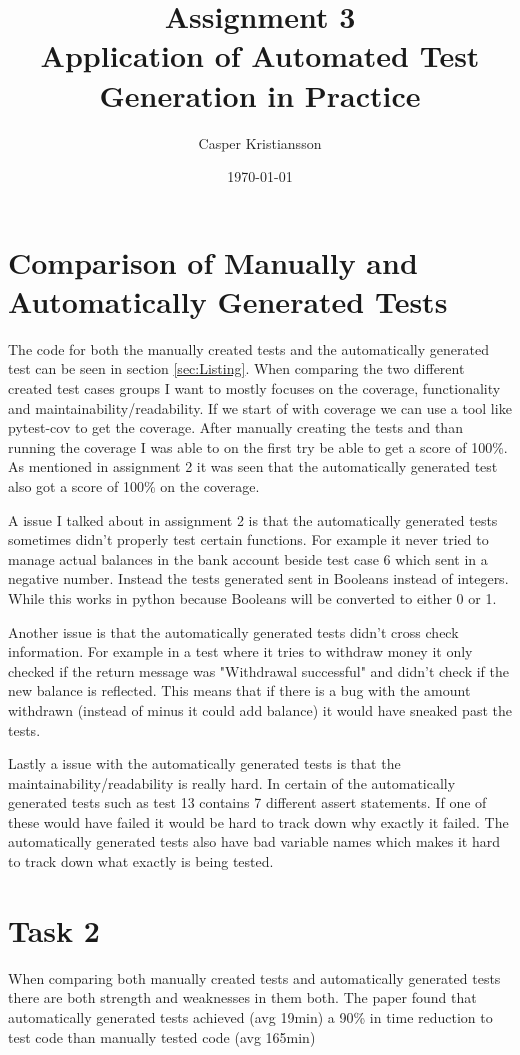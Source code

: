 \documentclass{article}
\title{Assignment 3\\Application of Automated Test Generation in Practice}
\author{Casper Kristiansson}
\date{\today}
\begin{document}
\maketitle

\section{Comparison of Manually and Automatically Generated Tests}
The code for both the manually created tests and the automatically generated test can be seen in section \ref{sec:Listing}. When comparing the two different created test cases groups I want to mostly focuses on the coverage, functionality and maintainability/readability. If we start of with coverage we can use a tool like pytest-cov\cite{Welcomet80:online} to get the coverage. After manually creating the tests and than running the coverage I was able to on the first try be able to get a score of 100\%. As mentioned in assignment 2 it was seen that the automatically generated test also got a score of 100\% on the coverage.

A issue I talked about in assignment 2 is that the automatically generated tests sometimes didn't properly test certain functions. For example it never tried to manage actual balances in the bank account beside test case 6 which sent in a negative number. Instead the tests generated sent in Booleans instead of integers. While this works in python because Booleans will be converted to either 0 or 1.

Another issue is that the automatically generated tests didn't cross check information. For example in a test where it tries to withdraw money it only checked if the return message was "Withdrawal successful" and didn't check if the new balance is reflected. This means that if there is a bug with the amount withdrawn (instead of minus it could add balance) it would have sneaked past the tests.

Lastly a issue with the automatically generated tests is that the maintainability/readability is really hard. In certain of the automatically generated tests such as test 13 contains 7 different assert statements. If one of these would have failed it would be hard to track down why exactly it failed. The automatically generated tests also have bad variable names which makes it hard to track down what exactly is being tested.

\section{Task 2}
When comparing both manually created tests and automatically generated tests there are both strength and weaknesses in them both. The paper  \cite{enoiu2017comparative} found that automatically generated tests achieved (avg 19min) a 90\% in time reduction to test code than manually tested code (avg 165min)
\end{document}
